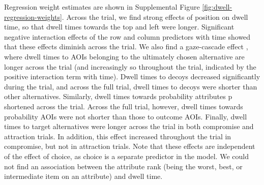 \documentclass[11pt, a4paper]{article}
\begin{document}
Regression weight estimates are shown in Supplemental Figure \ref{fig:dwell-regression-weights}. Across the trial, we find strong effects of position on dwell time, so that dwell times towards the top and left were longer. Significant negative interaction effects of the row and column predictors with time showed that these effects diminish across the trial. We also find a gaze-cascade effect \parencite{mullett2016ImplicationsVisualAttention,shimojo2003GazeBiasBoth}, where dwell times to AOIs belonging to the ultimately chosen alternative are longer across the trial (and increasingly so throughout the trial, indicated by the positive interaction term with time). Dwell times to decoys decreased significantly during the trial, and across the full trial, dwell times to decoys were shorter than other alternatives. Similarly, dwell times towards probability attributes p shortened across the trial. Across the full trial, however, dwell times towards probability AOIs were not shorter than those to outcome AOIs. Finally, dwell times to target alternatives were longer across the trial in both compromise and attraction trials. In addition, this effect increased throughout the trial in compromise, but not in attraction trials. Note that these effects are independent of the effect of choice, as choice is a separate predictor in the model. We could not find an association between the attribute rank (being the worst, best, or intermediate item on an attribute) and dwell time.
\end{document}
